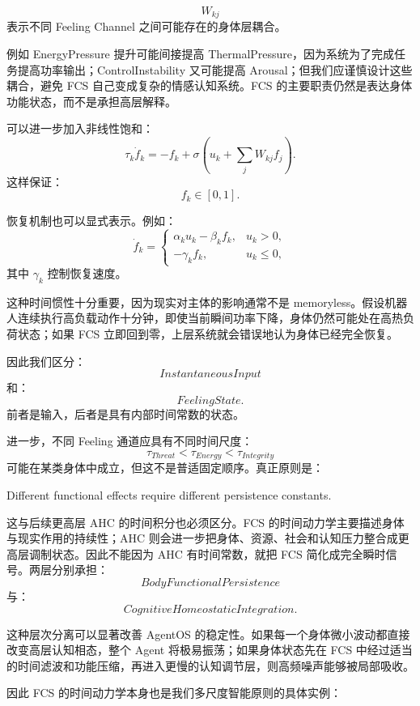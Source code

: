 \[
W_{kj}
\]
表示不同 Feeling Channel 之间可能存在的身体层耦合。

例如 EnergyPressure 提升可能间接提高 ThermalPressure，因为系统为了完成任务提高功率输出；ControlInstability 又可能提高 Arousal；但我们应谨慎设计这些耦合，避免 FCS 自己变成复杂的情感认知系统。FCS 的主要职责仍然是表达身体功能状态，而不是承担高层解释。

可以进一步加入非线性饱和：
\[
\tau_k\dot f_k
=
-f_k+
\sigma
\left(
u_k+\sum_j W_{kj}f_j
\right).
\]
这样保证：
\[
f_k\in[0,1].
\]

恢复机制也可以显式表示。例如：
\[
\dot f_k
=
\begin{cases}
\alpha_k u_k-\beta_k f_k,
&
u_k>0,
\\
-\gamma_k f_k,
&
u_k\le0,
\end{cases}
\]
其中 $\gamma_k$ 控制恢复速度。

这种时间惯性十分重要，因为现实对主体的影响通常不是 memoryless。假设机器人连续执行高负载动作十分钟，即使当前瞬间功率下降，身体仍然可能处在高热负荷状态；如果 FCS 立即回到零，上层系统就会错误地认为身体已经完全恢复。

因此我们区分：
\[
InstantaneousInput
\]
和：
\[
FeelingState.
\]
前者是输入，后者是具有内部时间常数的状态。

进一步，不同 Feeling 通道应具有不同时间尺度：
\[
\tau_{Threat}
<
\tau_{Energy}
<
\tau_{Integrity}
\]
可能在某类身体中成立，但这不是普适固定顺序。真正原则是：
\begin{statementbox}
Different functional effects require different persistence constants.
\end{statementbox}

这与后续更高层 AHC 的时间积分也必须区分。FCS 的时间动力学主要描述身体与现实作用的持续性；AHC 则会进一步把身体、资源、社会和认知压力整合成更高层调制状态。因此不能因为 AHC 有时间常数，就把 FCS 简化成完全瞬时信号。两层分别承担：
\[
BodyFunctionalPersistence
\]
与：
\[
CognitiveHomeostaticIntegration.
\]

这种层次分离可以显著改善 AgentOS 的稳定性。如果每一个身体微小波动都直接改变高层认知相态，整个 Agent 将极易振荡；如果身体状态先在 FCS 中经过适当的时间滤波和功能压缩，再进入更慢的认知调节层，则高频噪声能够被局部吸收。

因此 FCS 的时间动力学本身也是我们多尺度智能原则的具体实例：
\begin{statementbox}
\centering
{}
\end{statementbox}


